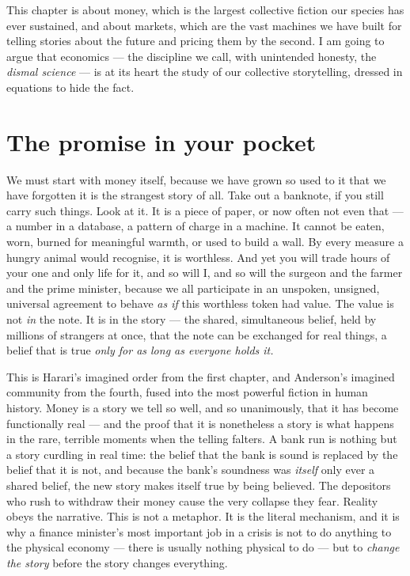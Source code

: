 This chapter is about money, which is the largest collective fiction our species has ever sustained, and about markets, which are the vast machines we have built for telling stories about the future and pricing them by the second. I am going to argue that economics — the discipline we call, with unintended honesty, the \emph{dismal science} — is at its heart the study of our collective storytelling, dressed in equations to hide the fact.

\section*{The promise in your pocket}

We must start with money itself, because we have grown so used to it that we have forgotten it is the strangest story of all. Take out a banknote, if you still carry such things. Look at it. It is a piece of paper, or now often not even that — a number in a database, a pattern of charge in a machine. It cannot be eaten, worn, burned for meaningful warmth, or used to build a wall. By every measure a hungry animal would recognise, it is worthless. And yet you will trade hours of your one and only life for it, and so will I, and so will the surgeon and the farmer and the prime minister, because we all participate in an unspoken, unsigned, universal agreement to behave \emph{as if} this worthless token had value. The value is not \emph{in} the note. It is in the story — the shared, simultaneous belief, held by millions of strangers at once, that the note can be exchanged for real things, a belief that is true \emph{only for as long as everyone holds it.}

This is Harari's imagined order from the first chapter, and Anderson's imagined community from the fourth, fused into the most powerful fiction in human history. Money is a story we tell so well, and so unanimously, that it has become functionally real — and the proof that it is nonetheless a story is what happens in the rare, terrible moments when the telling falters. A bank run is nothing but a story curdling in real time: the belief that the bank is sound is replaced by the belief that it is not, and because the bank's soundness was \emph{itself} only ever a shared belief, the new story makes itself true by being believed. The depositors who rush to withdraw their money cause the very collapse they fear. Reality obeys the narrative. This is not a metaphor. It is the literal mechanism, and it is why a finance minister's most important job in a crisis is not to do anything to the physical economy — there is usually nothing physical to do — but to \emph{change the story} before the story changes everything.


